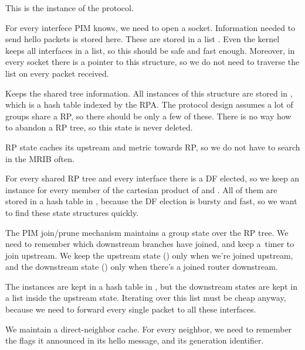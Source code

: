 \begin{description}[style=nextline]
\item[\ttt{pim\_proto}]
  This is the instance of the protocol.

\item[\ttt{pim\_iface}]
  For every interfece PIM knows, we need to open a socket. Information needed
  to send hello packets is stored here. These are stored in a list
  . Even the kernel keeps all interfaces in a list, so
  this should be safe and fast enough. Moreover, in every socket there is
  a pointer to this structure, so we do not need to traverse the list on every
  packet received.

\item[\ttt{pim\_rp}]
  Keeps the shared tree information. All instances of this structure are stored
  in , which is a hash table indexed by the RPA. The
  protocol design assumes a lot of groups share a RP, so there should be only
  a few of these. There is no way how to abandon a RP tree, so this state is
  never deleted.

  RP state caches its upstream and metric towards RP, so we do not have to
  search in the MRIB often.

\item[\ttt{pim\_rp\_iface}]
  For every shared RP tree and every interface there is a DF elected, so we
  keep an instance for every member of the cartesian product of  and
  . All of them are stored in a hash table in ,
  because the DF election is bursty and fast, so we want to find these state
  structures quickly.

\item[\ttt{pim\_grp}, \ttt{pim\_grp\_iface}]
  The PIM join/prune mechanism maintains a group state over the RP tree. We
  need to remember which downstream branches have joined, and keep a~timer to
  join upstream. We keep the upstream state () only when we're
  joined upstream, and the downstream state  () only when
  there's a joined router downstream.

  The  instances are kept in a hash table in , but the
  downstream states are kept in a list inside the upstream state. Iterating
  over this list must be cheap anyway, because we need to forward every single
  packet to all these interfaces.

\item[\ttt{pim\_neigh}]
  We maintain a direct-neighbor cache. For every neighbor, we need to remember
  the flags it announced in its hello message, and its generation identifier.

\end{description}

